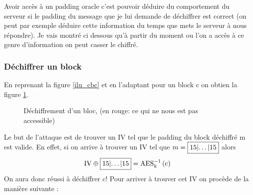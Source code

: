 \documentclass[a4paper, 12pt]{article}
\begin{document}
Avoir accès à un padding oracle c'est pouvoir déduire du comportement du serveur si le padding du message que je lui demande de déchiffrer est correct (on peut par exemple déduire cette information du temps que mets le serveur à nous répondre).
Je vais montré ci dessous qu'à partir du moment ou l'on a accès à ce genre d'information on peut casser le chiffré.

\subsubsection{Déchiffrer un block}
En reprenant la figure \ref{ilu_cbc} et en l'adaptant pour un block c on obtien la figure \ref{cbcdec1block}. 

\begin{figure}[h]
\centering
{}
\caption{Déchiffrement d'un bloc, (en rouge: ce qui ne nous est pas accessible)}
\label{cbcdec1block}
\end{figure}

Le but de l'attaque est de trouver un IV tel que le padding du block déchiffré m est valide. En effet, si on arrive à trouver un IV tel que $m = \fbox{15|\dots|15}$ alors 
$$ 
\text{IV} \oplus \fbox{15|\dots|15} = \text{AES}^{-1}_{k}\left(\text{c}\right)
$$
On aura donc réussi à déchiffrer c! Pour arriver à trouver cet IV on procède de la manière suivante : \\
\end{document}
